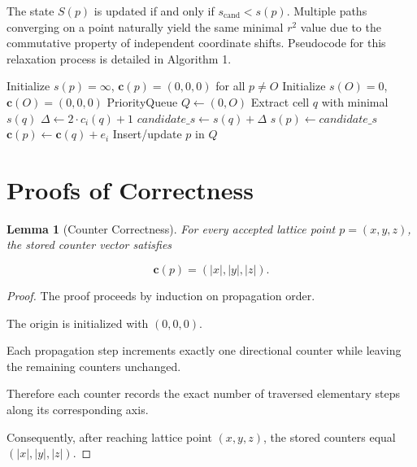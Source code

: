 \documentclass[11pt,a4paper]{article}
\newtheorem{lemma}{Lemma}
\begin{document}
The state $S(p)$ is updated if and only if $s_{\text{cand}} < s(p)$. Multiple paths converging on a point naturally yield the same minimal $r^2$ value due to the commutative property of independent coordinate shifts. Pseudocode for this relaxation process is detailed in Algorithm 1.

\begin{algorithm}
\caption{Unsigned Squared Distance Propagation}
\begin{algorithmic}[1]
\State Initialize $s(p) = \infty$, $\mathbf{c}(p) = (0,0,0)$ for all $p \neq O$
\State Initialize $s(O) = 0$, $\mathbf{c}(O) = (0,0,0)$
\State PriorityQueue $Q \leftarrow (0, O)$
    \State Extract cell $q$ with minimal $s(q)$
        \State $\Delta \leftarrow 2 \cdot c_i(q) + 1$
        \State $candidate\_s \leftarrow s(q) + \Delta$
            \State $s(p) \leftarrow candidate\_s$
            \State $\mathbf{c}(p) \leftarrow \mathbf{c}(q) + e_i$
            \State Insert/update $p$ in $Q$
        \EndIf
    \EndFor
\EndWhile
\end{algorithmic}
\end{algorithm}

\section{Proofs of Correctness}
\label{sec:proofs}

\begin{lemma}[Counter Correctness]

For every accepted lattice point
$p=(x,y,z)$,
the stored counter vector satisfies

\[
\mathbf{c}(p)=(|x|,|y|,|z|).
\]

\end{lemma}

\begin{proof}

The proof proceeds by induction on propagation order.

The origin is initialized with
$(0,0,0)$.

Each propagation step increments exactly one directional counter while leaving the remaining counters unchanged.

Therefore each counter records the exact number of traversed elementary steps along its corresponding axis.

Consequently, after reaching lattice point $(x,y,z)$, the stored counters equal $(|x|,|y|,|z|)$.

\end{proof}
\end{document}
